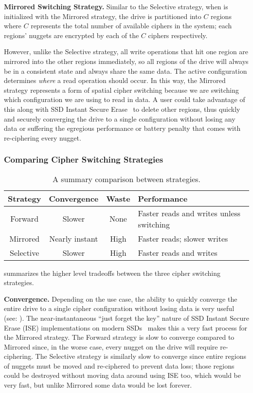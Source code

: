 \textbf{Mirrored Switching Strategy.} Similar to the Selective strategy, when
\sys{} is initialized with the Mirrored strategy, the drive is partitioned
into $C$ regions where $C$ represents the total number of available ciphers in
the system; each regions' nuggets are encrypted by each of the $C$ ciphers
respectively.

However, unlike the Selective strategy, all write operations that hit one region
are mirrored into the other regions immediately, so all regions of the drive
will always be in a consistent state and always share the same data. The active
configuration determines \emph{where} a read operation should occur. In this
way, the Mirrored strategy represents a form of spatial cipher switching because
we are switching which configuration we are using to read in data. A user could
take advantage of this along with SSD Instant Secure Erase~\cite{ISE1,ISE2,ISE3}
to delete other regions, thus quickly and securely converging the drive to a
single configuration without losing any data or suffering the egregious
performance or battery penalty that comes with re-ciphering every nugget.

\subsubsection{Comparing Cipher Switching Strategies}

\begin{table}[ht]
   \begin{tabular}{@{}|c|c|c|C{25mm}|@{}}
      \toprule
      \textbf{Strategy} & \textbf{Convergence} & \textbf{Waste} &
      \textbf{Performance} \\
      \midrule
      Forward   & Slower       & None & Faster reads and writes unless switching
      \\\hline
      Mirrored  & Nearly instant & High & Faster reads; slower writes \\
      \hline
      Selective & Slower       & High & Faster reads and writes  \\
      \hline
   \end{tabular}
   \caption{A summary comparison between strategies.}
   \label{tbl:strategies-advantages}
\end{table}

 summarizes the higher level tradeoffs between the
three cipher switching strategies.

\textbf{Convergence.} Depending on the use case, the ability to quickly converge
the entire drive to a single cipher configuration without losing data is very
useful (see: ). The near-instantaneous ``just forget the key''
nature of SSD Instant Secure Erase (ISE) implementations on modern
SSDs~\cite{ISE1,ISE2,ISE3} makes this a very fast process for the Mirrored
strategy. The Forward strategy is slow to converge compared to Mirrored since,
in the worse case, every nugget on the drive will require re-ciphering. The
Selective strategy is similarly slow to converge since entire regions of nuggets
must be moved and re-ciphered to prevent data loss; those regions could be
destroyed without moving data around using ISE too, which would be very fast,
but unlike Mirrored some data would be lost forever.

